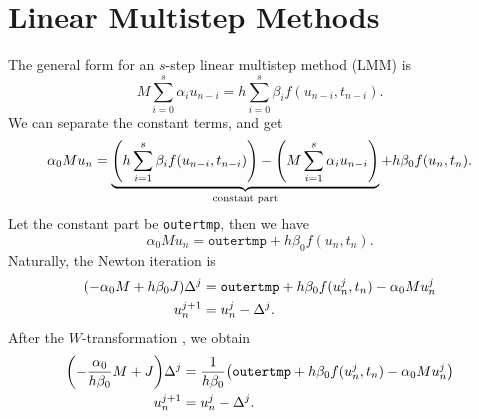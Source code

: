 \documentclass[a4paper,9pt]{article}
\theoremstyle{definition}
\theoremstyle{remark}
\begin{document}
\section{Linear Multistep Methods}
The general form for an $s$-step linear multistep method (LMM) is
\begin{equation}
  M \sum_{i=0}^s \alpha_{i} u_{n-i} = h \sum_{i=0}^s \beta_{i} f(u_{n-i},
  t_{n-i}).
\end{equation}
We can separate the constant terms, and get
\begin{equation}
  \alpha_{0} M u_{n} = \underbrace{\qty(h \sum_{i=1}^s \beta_{i} f(u_{n-i},
  t_{n-i})) - \qty(M \sum_{i=1}^s \alpha_{i} u_{n-i})}_\text{constant part} + h
  \beta_{0} f(u_{n}, t_{n}).
\end{equation}
Let the constant part be \texttt{outertmp}, then we have
\begin{equation}
  \alpha_{0} M u_{n} = \texttt{outertmp} + h \beta_{0} f(u_{n}, t_{n}).
\end{equation}
Naturally, the Newton iteration is
\begin{align}
  \qty(-\alpha_{0} M + h\beta_{0}J) \Delta^j &= \texttt{outertmp} + h \beta_{0}
  f(u^j_{n}, t_{n}) - \alpha_{0} M u^j_{n} \\
  u^{j+1}_n &= u^j_n - \Delta^j.
\end{align}
After the $W$-transformation \cite[Chapter~IV.5]{hairer2010solving}, we obtain
\begin{align} \label{eq:newton_lmm}
  \qty(-\frac{\alpha_{0}}{h\beta_{0}} M + J) \Delta^j &=
  \frac{1}{h\beta_{0}} \qty(\texttt{outertmp} + h \beta_{0} f(u^j_{n}, t_{n}) -
  \alpha_{0} M u^j_{n}) \\
  u^{j+1}_n &= u^j_n - \Delta^j.
\end{align}
\end{document}
